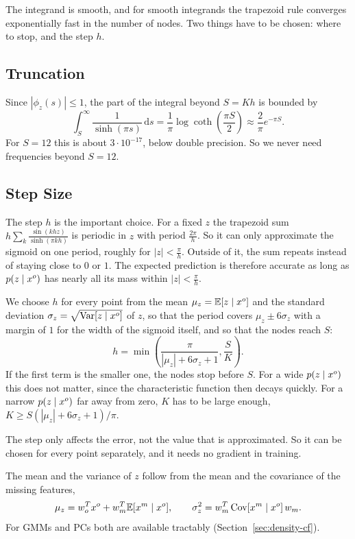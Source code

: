The integrand is smooth, and for smooth integrands the trapezoid rule converges exponentially fast in the number of nodes.
Two things have to be chosen: where to stop, and the step $h$.

\subsection{Truncation}

Since $|\phi_z(s)| \leq 1$, the part of the integral beyond $S = Kh$ is bounded by
\[
  \int_S^\infty \frac{1}{\sinh(\pi s)} \, \mathrm{d}s = \frac{1}{\pi} \log \coth\left(\frac{\pi S}{2}\right) \approx \frac{2}{\pi} e^{-\pi S}.
\]
For $S = 12$ this is about $3 \cdot 10^{-17}$, below double precision. So we never need frequencies beyond $S = 12$.

\subsection{Step Size}

The step $h$ is the important choice. For a fixed $z$ the trapezoid sum
$h \sum_{k} \frac{\sin(khz)}{\sinh(\pi k h)}$ is periodic in $z$ with period $\frac{2\pi}{h}$. So it can only
approximate the sigmoid on one period, roughly for $|z| < \frac{\pi}{h}$. Outside of it, the sum repeats instead
of staying close to $0$ or $1$. The expected prediction is therefore accurate as long as $p(z \mid x^o)$ has
nearly all its mass within $|z| < \frac{\pi}{h}$.

We choose $h$ for every point from the mean $\mu_z = \mathbb{E}[z \mid x^o]$ and the standard deviation
$\sigma_z = \sqrt{\mathrm{Var}[z \mid x^o]}$ of $z$, so that the period covers $\mu_z \pm 6 \sigma_z$ with a margin of $1$ for the width of
the sigmoid itself, and so that the nodes reach $S$:
\[
  h = \min \left( \frac{\pi}{|\mu_z| + 6 \sigma_z + 1}, \frac{S}{K} \right).
\]
If the first term is the smaller one, the nodes stop before $S$. For a wide $p(z \mid x^o)$ this does not matter, since the
characteristic function then decays quickly. For a narrow $p(z \mid x^o)$ far away from zero, $K$ has to be large enough, $K \geq S (|\mu_z| + 6\sigma_z + 1) / \pi$.

The step only affects the error, not the value that is approximated. So it can be chosen for every point separately, and it needs
no gradient in training.

The mean and the variance of $z$ follow from the mean and the covariance of the missing features,
\[
  \mu_z = w_o^T x^o + w_m^T \mathbb{E}[x^m \mid x^o], \qquad \sigma_z^2 = w_m^T\, \mathrm{Cov}[x^m \mid x^o]\, w_m.
\]
For GMMs and PCs both are available tractably (Section~\ref{sec:density-cf}).

